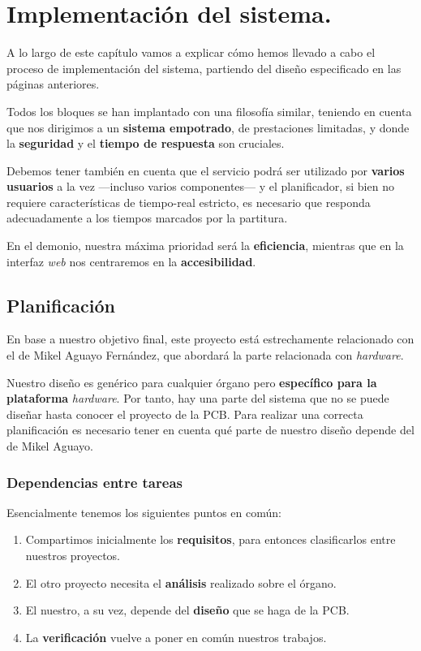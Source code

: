 \chapter{Implementación del sistema.}
\label{cap: capitulo_5}

A lo largo de este capítulo vamos a explicar cómo hemos llevado a cabo el proceso de implementación del sistema, partiendo del diseño especificado en las páginas anteriores.

Todos los bloques se han implantado con una filosofía similar, teniendo en cuenta que nos dirigimos a un \textbf{sistema empotrado}, de prestaciones limitadas, y donde la \textbf{seguridad} y el \textbf{tiempo de respuesta} son cruciales.

Debemos tener también en cuenta que el servicio podrá ser utilizado por \textbf{varios usuarios} a la vez ---incluso varios componentes--- y el planificador, si bien no requiere características de tiempo-real estricto, es necesario que responda adecuadamente a los tiempos marcados por la partitura.

En el demonio, nuestra máxima prioridad será la \textbf{eficiencia}, mientras que en la interfaz \textit{web} nos centraremos en la \textbf{accesibilidad}.

\section{Planificación}

En base a nuestro objetivo final, este proyecto está estrechamente relacionado con el de Mikel Aguayo Fernández, que abordará la parte relacionada con \textit{hardware}.

Nuestro diseño es genérico para cualquier órgano pero \textbf{específico para la plataforma} \textit{hardware}. Por tanto, hay una parte del sistema que no se puede diseñar hasta conocer el proyecto de la \acrshort{PCB}. Para realizar una correcta planificación es necesario tener en cuenta qué parte de nuestro diseño depende del de Mikel Aguayo.

\subsection{Dependencias entre tareas}

Esencialmente tenemos los siguientes puntos en común:

\begin{enumerate}
	\item Compartimos inicialmente los \textbf{requisitos}, para entonces clasificarlos entre nuestros proyectos.
	\item El otro proyecto necesita el \textbf{análisis} realizado sobre el órgano.
	\item El nuestro, a su vez, depende del \textbf{diseño} que se haga de la \acrshort{PCB}.
	\item La \textbf{verificación} vuelve a poner en común nuestros trabajos.
\end{enumerate}

